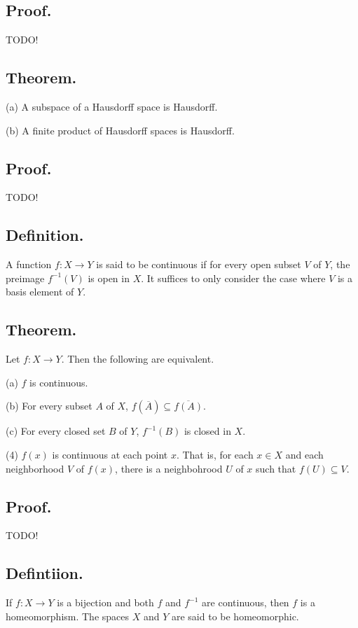 \documentclass[titlepage]{article}
\begin{document}
\subsection{Proof.} TODO!

\subsection{Theorem.}

(a) A subspace of a Hausdorff space is Hausdorff.

(b) A finite product of Hausdorff spaces is Hausdorff.

\subsection{Proof.} TODO!

\subsection{Definition.} A function $f: X \to Y$ is said to be continuous if for every open subset $V$ of $Y$, the preimage $f^{-1}(V)$ is open in $X$. It suffices to only consider the case where $V$ is a basis element of $Y$.

\subsection{Theorem.} Let $f: X \to Y$. Then the following are equivalent.

(a) $f$ is continuous.

(b) For every subset $A$ of $X$, $f(\overline{A}) \subseteq \overline{f(A)}$.

(c) For every closed set $B$ of $Y$, $f^{-1}(B)$ is closed in $X$.

(4) $f(x)$ is continuous at each point $x$. That is, for each $x \in X$ and each neighborhood $V$ of $f(x)$, there is a neighbohrood $U$ of $x$ such that $f(U)\subseteq V$.

\subsection{Proof.} TODO!

\subsection{Defintiion.} If $f: X \to Y$ is a bijection and both $f$ and $f^{-1}$ are continuous, then $f$ is a homeomorphism. The spaces $X$ and $Y$ are said to be homeomorphic.
\end{document}
